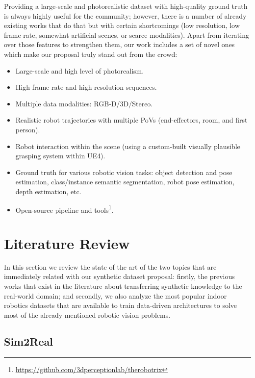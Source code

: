 Providing a large-scale and photorealistic dataset with high-quality ground truth is always highly useful for the community; however, there is a number of already existing works that do that but with certain shortcomings (low resolution, low frame rate, somewhat artificial scenes, or scarce modalities). Apart from iterating over those features to strengthen them, our work includes a set of novel ones which make our proposal truly stand out from the crowd:

\begin{itemize}
    \item Large-scale and high level of photorealism.
    \item High frame-rate and high-resolution sequences.
    \item Multiple data modalities: RGB-D/3D/Stereo.
	\item Realistic robot trajectories with multiple \acsp{PoV} (end-effectors, room, and first person).
	\item Robot interaction within the scene (using a custom-built visually plausible grasping system within \ac{UE4}).
    \item Ground truth for various robotic vision tasks: object detection and pose estimation, class/instance semantic segmentation, robot pose estimation, depth estimation, etc.
    \item Open-source pipeline and tools\footnote{\url{https://github.com/3dperceptionlab/therobotrix}}.
\end{itemize}

\clearpage

\section{Literature Review}
\label{cha:sim2real:sec:related_works}

In this section we review the state of the art of the two topics that are immediately related with our synthetic dataset proposal: firstly, the previous works that exist in the literature about transferring synthetic knowledge to the real-world domain; and secondly, we also analyze the most popular indoor robotics datasets that are available to train data-driven architectures to solve most of the already mentioned robotic vision problems.

\subsection{Sim2Real}

